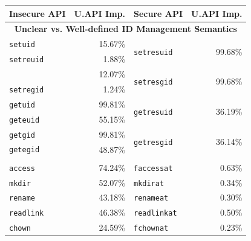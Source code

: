 \begin{table}[t!b!]
\footnotesize
\centering
\setlength{\tabcolsep}{5pt}  
\begin{tabular}{m{0.85in}rm{0.85in}r}
\toprule
{\bf Insecure API} & {\bf U.API Imp.} & {\bf Secure API} & {\bf U.API Imp.}\\
\midrule
\multicolumn{4}{c}{\bf Unclear vs. Well-defined ID Management Semantics} \\
\midrule
\addlinespace
{\tt setuid}   & 15.67\% & \multirow{2}{*}{\tt setresuid} & \multirow{2}{*}{99.68\%} \\
{\tt setreuid} &  1.88\% & & \\
\addlinespace {\tt setgid}   & 12.07\% & \multirow{2}{*}{\tt setresgid} & \multirow{2}{*}{99.68\%} \\
{\tt setregid} &  1.24\% & & \\
\addlinespace
{\tt getuid}   & 99.81\% & \multirow{2}{*}{\tt getresuid} & \multirow{2}{*}{36.19\%} \\
{\tt geteuid}  & 55.15\% & & \\
\addlinespace
{\tt getgid}   & 99.81\% & \multirow{2}{*}{\tt getresgid} & \multirow{2}{*}{36.14\%} \\
{\tt getegid}  & 48.87\% & & \\
\addlinespace
\midrule
\multicolumn{4}{c}{\bf Nonatomic vs. Atomic Directory operations} \\
\midrule
{\tt access}   & 74.24\% & {\tt faccessat}  & 0.63\% \\
\addlinespace
{\tt mkdir}    & 52.07\% & {\tt mkdirat}    & 0.34\% \\
{\tt rename}   & 43.18\% & {\tt renameat}   & 0.30\% \\
{\tt readlink} & 46.38\% & {\tt readlinkat} & 0.50\% \\
\addlinespace
{\tt chown}    & 24.59\% & {\tt fchownat}   & 0.23\% \\

\end{tabular}
\end{table}
